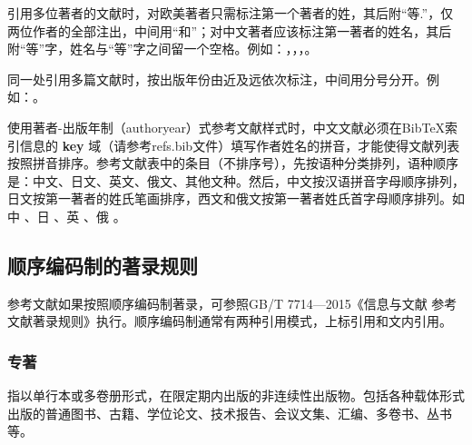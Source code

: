 
引用多位著者的文献时，对欧美著者只需标注第一个著者的姓，其后附“等.”，仅两位作者的全部注出，中间用“和”；对中文著者应该标注第一著者的姓名，其后附“等”字，姓名与“等”字之间留一个空格。例如：\citet{nadkarni1992}，\citet{nair1992}，\citet{zhu1973}，\citet{hua1973}。


同一处引用多篇文献时，按出版年份由近及远依次标注，中间用分号分开。例如：\citet{nadkarni1992,hua1973,huo1981,timoshenko1959,ding2001}。


使用著者-出版年制（authoryear）式参考文献样式时，中文文献必须在BibTeX索引信息的 \textbf{key} 域（请参考refs.bib文件）填写作者姓名的拼音，才能使得文献列表按照拼音排序。参考文献表中的条目（不排序号），先按语种分类排列，语种顺序是：中文、日文、英文、俄文、其他文种。然后，中文按汉语拼音字母顺序排列，日文按第一著者的姓氏笔画排序，西文和俄文按第一著者姓氏首字母顺序排列。如中 \citep{niu2013zonghe}、日 \citep{Bohan1928}、英 \citep{stamerjohanns2009mathml}、俄 \citep{Dubrovin1906}。

\subsection{顺序编码制的著录规则}

参考文献如果按照顺序编码制著录，可参照GB/T 7714—2015《信息与文献 参考文献著录规则》执行。顺序编码制通常有两种引用模式，上标引用\cite{li2002}和文内引用。

\subsubsection{专著}

指以单行本或多卷册形式，在限定期内出版的非连续性出版物。包括各种载体形式出版的普通图书、古籍、学位论文、技术报告、会议文集、汇编、多卷书、丛书等。
\cite{li2002,tian1986,zhao1998,xin1994,peebles2001,lin2006}

